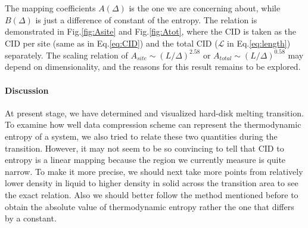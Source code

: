 \documentclass[a4paper]{article}
\begin{document}
The mapping coefficients $A(\Delta)$ is the one we are concerning about, while $B(\Delta)$ is just a difference of constant of the entropy. The relation is demonstrated in Fig.\ref{fig:Asite} and Fig.\ref{fig:Atot}, where the CID is taken as the CID per site (same as in Eq.\ref{eq:CID}) and the total CID ($\mathscr{L}$ in Eq.\ref{eq:length}) separately. The scaling relation of $A_{site} \sim (L/\Delta)^{2.58}$ or $A_{total} \sim (L/\Delta)^{0.58}$ may depend on dimensionality, and the reasons for this result remains to
be explored.

\paragraph{Discussion}

At present stage, we have determined and visualized hard-disk melting transition. To examine how well data compression scheme can represent the thermodynamic entropy of a system, we also tried to relate these two quantities during the transition. However, it may not seem to be so convincing to tell that CID to entropy is a linear mapping because the region we currently measure is quite narrow. To make it more precise, we should next take more points from relatively lower density in liquid to higher density in solid across the transition area to see the exact relation. Also we should better follow the method mentioned before to obtain the absolute value of thermodynamic entropy rather the one that differs by a constant.
\end{document}
